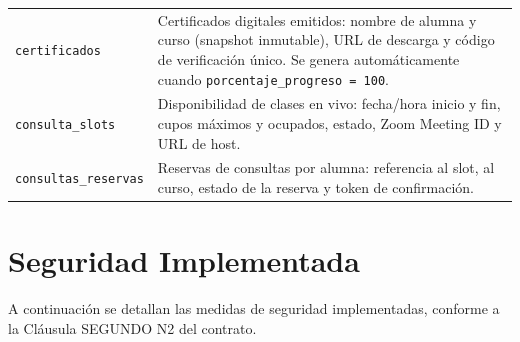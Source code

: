 \documentclass[a4paper,11pt]{article}
\begin{document}
\begin{longtable}{L{3.8cm} L{10.8cm}}
\texttt{certificados} &
  Certificados digitales emitidos: nombre de alumna y curso (snapshot
  inmutable), URL de descarga y c\'odigo de verificaci\'on \'unico.
  Se genera autom\'aticamente cuando \texttt{porcentaje\_progreso = 100}. \\

\texttt{consulta\_slots} &
  Disponibilidad de clases en vivo: fecha/hora inicio y fin, cupos
  m\'aximos y ocupados, estado, Zoom Meeting ID y URL de host. \\

\texttt{consultas\_reservas} &
  Reservas de consultas por alumna: referencia al slot, al curso,
  estado de la reserva y token de confirmaci\'on. \\

\end{longtable}


\section{Seguridad Implementada}
\label{sec:seguridad}

A continuaci\'on se detallan las medidas de seguridad implementadas,
conforme a la Cl\'ausula SEGUNDO N\textdegree{}2 del contrato.
\end{document}
